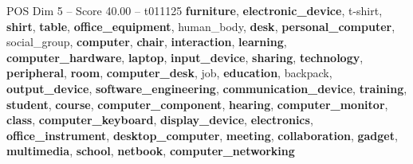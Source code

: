 \begin{textsample}{POS Dim 5 – Score 40.00 – t011125}  \label{ex:f5_pos_003}
\textbf{furniture}, \textbf{electronic\_device}, t-shirt, \textbf{shirt}, \textbf{table}, \textbf{office\_equipment}, human\_body, \textbf{desk}, \textbf{personal\_computer}, social\_group, \textbf{computer}, \textbf{chair}, \textbf{interaction}, \textbf{learning}, \textbf{computer\_hardware}, \textbf{laptop}, \textbf{input\_device}, \textbf{sharing}, \textbf{technology}, \textbf{peripheral}, \textbf{room}, \textbf{computer\_desk}, job, \textbf{education}, backpack, \textbf{output\_device}, \textbf{software\_engineering}, \textbf{communication\_device}, \textbf{training}, \textbf{student}, \textbf{course}, \textbf{computer\_component}, \textbf{hearing}, \textbf{computer\_monitor}, \textbf{class}, \textbf{computer\_keyboard}, \textbf{display\_device}, \textbf{electronics}, \textbf{office\_instrument}, \textbf{desktop\_computer}, \textbf{meeting}, \textbf{collaboration}, \textbf{gadget}, \textbf{multimedia}, \textbf{school}, \textbf{netbook}, \textbf{computer\_networking}

\end{textsample}

